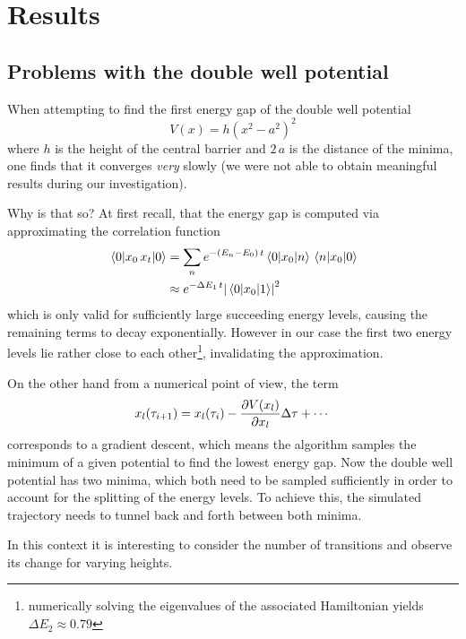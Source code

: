 \section{Results}
\subsection{Problems with the double well potential}
When attempting to find the first energy gap of the double well potential
\begin{equation}
    V(x)=h\left(x^2-a^2\right)^2
    \label{eq:double-well}
\end{equation}
where $h$ is the height of the central barrier and $2\,a$ is the distance of the
minima, one finds that it converges \emph{very} slowly (we were not able to
obtain meaningful results during our investigation).

Why is that so? At first recall, that the energy gap is computed via
approximating the correlation function
\begin{align*}
    \ev{x_0\,x_t}{0}&=\sum_{n}e^{-(E_n-E_0)\,t}\mel{0}{x_0}{n}\mel{n}{x_0}{0}
    \\&\approx{e^{-\Delta{E_1}\,t}}\abs{\mel{0}{x_0}{1}}^2
\end{align*}
which is only valid for sufficiently large succeeding energy levels, causing
the remaining terms to decay exponentially. However in our case the first two
energy levels lie rather close to each other\footnote{numerically solving the
eigenvalues of the associated Hamiltonian yields $\Delta{E_2}\approx0.79$},
invalidating the approximation.

On the other hand from a numerical point of view, the term
\begin{equation*}
    x_l(\tau_{i+1})=x_l(\tau_i)-\pdv{V(x_l)}{x_l}\Delta\tau+\dotsb
\end{equation*}
corresponds to a gradient descent, which means the algorithm samples the
minimum of a given potential to find the lowest energy gap. Now the double well
potential has two minima, which both need to be sampled sufficiently in order
to account for the splitting of the energy levels. To achieve this, the
simulated trajectory needs to tunnel back and forth between both minima.

In this context it is interesting to consider the number of transitions and
observe its change for varying heights.


